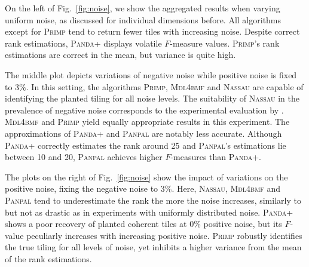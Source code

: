 On the left of Fig.~\ref{fig:noise}, we show the aggregated results when varying uniform noise, as discussed for individual dimensions before. All algorithms except for \textsc{Primp} tend to return fewer tiles with increasing noise. Despite correct rank estimations, \textsc{Panda+} displays volatile $F$-measure values. \textsc{Primp}'s rank estimations are correct in the mean, but variance is quite high.

The middle plot depicts variations of negative noise while positive noise is fixed to $3\%$. In this setting, the algorithms \textsc{Primp}, \textsc{Mdl4bmf} and \textsc{Nassau} are capable of identifying the planted tiling for all noise levels. The suitability of \textsc{Nassau} in the prevalence of negative noise corresponds to the experimental evaluation by \cite{karaev2015getting}. \textsc{Mdl4bmf} and \textsc{Primp} yield  equally appropriate results in this experiment.  The approximations of \textsc{Panda+} and \textsc{Panpal} are notably less accurate. Although \textsc{Panda+} correctly estimates the rank around 25 and \textsc{Panpal}'s estimations lie between 10 and 20, \textsc{Panpal} achieves higher $F$-measures than \textsc{Panda+}.  

The plots on the right of Fig.~\ref{fig:noise} show the impact of variations on the positive noise, fixing the negative noise to $3\%$. Here, \textsc{Nassau}, \textsc{Mdl4bmf} and \textsc{Panpal} tend to underestimate the rank the more the noise increases, similarly to but not as drastic as in experiments with uniformly distributed noise. \textsc{Panda+} shows a poor recovery of planted coherent tiles at $0\%$  positive noise, but its $F$-value peculiarly increases with increasing positive noise.  \textsc{Primp} robustly identifies the true tiling for all levels of noise, yet inhibits a higher variance from the mean of the rank estimations.
